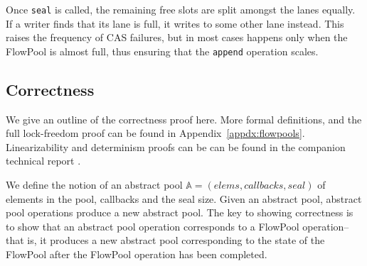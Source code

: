 Once \verb=seal= is called, the remaining free slots
are split amongst the lanes equally.
If a writer finds that its lane is full,
it writes to some other lane instead.
This raises the frequency of CAS failures, but in most
cases happens only when the FlowPool is almost full,
thus ensuring that the \verb=append= operation scales.



\vspace{-0.3cm}
\subsection{Correctness}
\label{sec:correctness}

We give an outline of the correctness proof here. More formal definitions, and
the full lock-freedom proof can be found in Appendix~\ref{appdx:flowpools}.
Linearizability and determinism proofs can be can be found in the companion
technical report \cite{Prokopec12}.

We define the notion of an abstract pool $\mathbb{A} = (elems,
callbacks, seal)$ of elements in the pool, callbacks and the seal
size.
Given an abstract pool, abstract pool operations produce a new
abstract pool.
The key to showing correctness is to show that an abstract pool operation
corresponds to a FlowPool operation-- that is, it produces a
new abstract pool corresponding to the state of the FlowPool after
the FlowPool operation has been completed.



%

